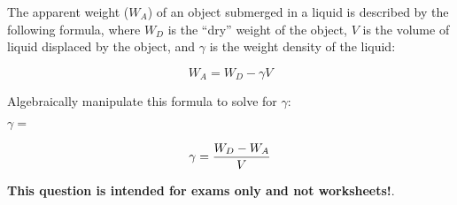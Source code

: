 

The apparent weight ($W_A$) of an object submerged in a liquid is described by the following formula, where $W_D$ is the ``dry'' weight of the object, $V$ is the volume of liquid displaced by the object, and $\gamma$ is the weight density of the liquid:

$$W_A = W_D - \gamma V$$

Algebraically manipulate this formula to solve for $\gamma$:

\vskip 20pt

$\gamma = $







$$\gamma = {{W_D - W_A} \over V}$$







{\bf This question is intended for exams only and not worksheets!}.



